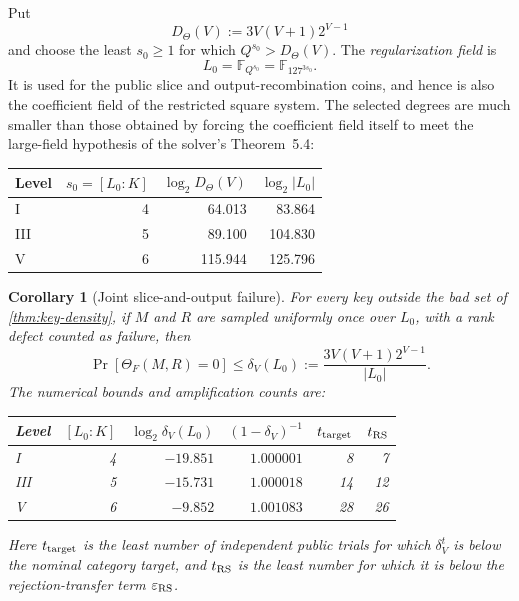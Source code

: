 \documentclass[10pt,a4paper]{article}
\newtheorem{corollary}[theorem]{Corollary}
\newcommand{\F}{\mathbb F}
\begin{document}
Put
\[
D_\Theta(V):=3V(V+1)2^{V-1}
\]
and choose the least $s_0\ge1$ for which $Q^{s_0}>D_\Theta(V)$.  The \emph{regularization field} is
\[
L_0=\F_{Q^{s_0}}=\F_{127^{3s_0}}.
\]
It is used for the public slice and output-recombination coins, and hence is also the coefficient field of the restricted square system.  The selected degrees are much smaller than those obtained by forcing the coefficient field itself to meet the large-field hypothesis of the solver's Theorem~5.4:
\begin{center}
\begin{tabular}{@{}lrrr@{}}
\toprule
Level & $s_0=[L_0:K]$ & $\log_2D_\Theta(V)$ & $\log_2|L_0|$\\
\midrule
I   & 4 & 64.013  & 83.864\\
III & 5 & 89.100  & 104.830\\
V   & 6 & 115.944 & 125.796\\
\bottomrule
\end{tabular}
\end{center}

\begin{corollary}[Joint slice-and-output failure]\label{cor:joint-sz}
For every key outside the bad set of \cref{thm:key-density}, if $M$ and $R$ are sampled uniformly once over $L_0$, with a rank defect counted as failure, then
\begin{equation}\label{eq:delta}
\Pr[\Theta_F(M,R)=0]
\le
\delta_V(L_0):=
\frac{3V(V+1)2^{V-1}}{|L_0|}.
\end{equation}
The numerical bounds and amplification counts are:
\begin{center}
\begin{tabular}{@{}lrrrrr@{}}
\toprule
Level & $[L_0:K]$ & $\log_2\delta_V(L_0)$ & $(1-\delta_V)^{-1}$ & $t_{\rm target}$ & $t_{\rm RS}$\\
\midrule
I   & 4 & $-19.851$ & $1.000001$ & 8  & 7\\
III & 5 & $-15.731$ & $1.000018$ & 14 & 12\\
V   & 6 & $-9.852$  & $1.001083$ & 28 & 26\\
\bottomrule
\end{tabular}
\end{center}
Here $t_{\rm target}$ is the least number of independent public trials for which $\delta_V^{t}$ is below the nominal category target, and $t_{\rm RS}$ is the least number for which it is below the rejection-transfer term $\varepsilon_{\rm RS}$.
\end{corollary}
\end{document}
